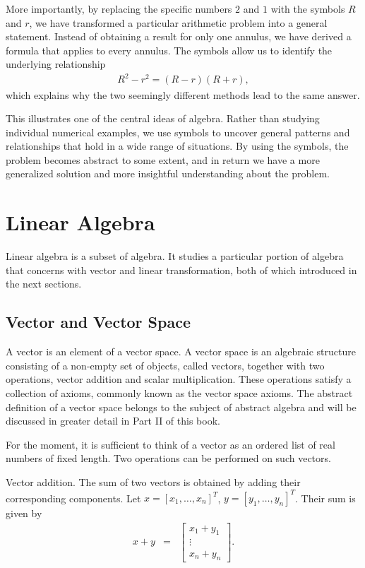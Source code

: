 More importantly, by replacing the specific numbers $2$ and $1$ with the symbols $R$ and $r$, we have transformed a particular arithmetic problem into a general statement. Instead of obtaining a result for only one annulus, we have derived a formula that applies to every annulus. The symbols allow us to identify the underlying relationship 
\begin{eqnarray} 
	R^2-r^2 = (R-r)(R+r), \nonumber 
\end{eqnarray} 
which explains why the two seemingly different methods lead to the same answer. 

This illustrates one of the central ideas of algebra. Rather than studying individual numerical examples, we use symbols to uncover general patterns and relationships that hold in a wide range of situations. By using the symbols, the problem becomes abstract to some extent, and in return we have a more generalized solution and more insightful understanding about the problem.

\section{Linear Algebra}

Linear algebra is a subset of algebra. It studies a particular portion of algebra that concerns with vector and linear transformation, both of which introduced in the next sections.

\subsection{Vector and Vector Space}

A vector is an element of a vector space. A vector space is an algebraic structure consisting of a non-empty set of objects, called vectors, together with two operations, vector addition and scalar multiplication. These operations satisfy a collection of axioms, commonly known as the vector space axioms. The abstract definition of a vector space belongs to the subject of abstract algebra and will be discussed in greater detail in Part II of this book.

For the moment, it is sufficient to think of a vector as an ordered list of real numbers of fixed length. Two operations can be performed on such vectors.

Vector addition. The sum of two vectors is obtained by adding their corresponding components. Let $x = [x_1,\ldots,x_n]^T$, $y = [y_1,\ldots,y_n]^T$. Their sum is given by
\begin{eqnarray}
	x+y
	&=&
	\left[
	\begin{array}{c}
		x_1+y_1 \\
		\vdots \\
		x_n+y_n
	\end{array}
	\right].
	\nonumber
\end{eqnarray}

